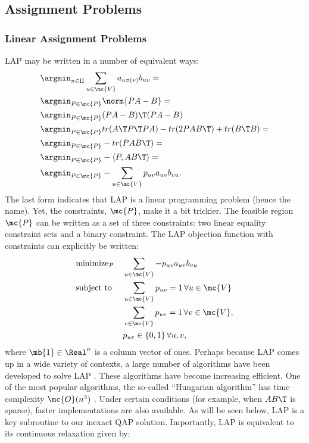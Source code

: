 \documentclass[10pt,journal,cspaper,compsoc]{IEEEtran}
\newcommand{\PmcP}{P \in \mc{P}}
\begin{document}
\subsection{Assignment Problems} %
\label{sub:assignment_problems}

\subsubsection{Linear Assignment Problems} %
\label{ssub:linear_assignment_problems}


LAP may be written in a number of equivalent ways:
\begin{align}
	 &\argmin_{\pi \in \Pi} \sum_{u \in \mc{V}} a_{u \pi(v)} b_{uv} =\nonumber\\
	&\argmin_{\PmcP} \norm{PA - B} =\nonumber\\
	&\argmin_{\PmcP} (PA-B)\T (PA-B) \nonumber\\ 
	&\argmin_{\PmcP} tr (A\T P\T PA) - tr(2PAB\T) + tr(B\T B)=\nonumber\\ 
	&\argmin_{\PmcP}  -tr (P AB\T) =\nonumber\\
	&\argmin_{\PmcP}  -\langle P, AB\T \rangle =\nonumber\\
	&\argmin_{\PmcP}  -\sum_{u \in \mc{V}} p_{uv} a_{uv} b_{vu}. \label{eq:LAP}
\end{align}
The last form indicates that LAP is a linear programming problem (hence the name).  Yet, the constraints, $\mc{P}$, make it a bit trickier.  The feasible region $\mc{P}$ can be written as a set of three constraints: two linear equality constraint sets and a binary constraint.  The LAP objection function with constraints can explicitly be written:
\begin{align}
		&\text{minimize}_P  &&\sum_{u \in \mc{V}} -p_{uv} a_{uv} b_{vu} \nonumber \\
		&\text{subject to } && \sum_{u \in \mc{V}} p_{uv} = 1 \, \forall u \in \mc{V} \nonumber \\
		& && \sum_{v \in \mc{V}} p_{uv} = 1 \, \forall v \in \mc{V}, \nonumber \\
		& &&p_{uv} \in \{0,1\} \, \forall u,v, \label{eq:LAP2}	
\end{align}
where $\mb{1} \in \Real^n$ is a column vector of ones.  
Perhaps because LAP comes up in a wide variety of contexts, a large number of algorithms have been developed to solve LAP \cite{Burkard2009}.  These algorithms have become increasing efficient.  One of the most popular algorithms, the so-called ``Hungarian algorithm'' has time complexity $\mc{O}(n^3)$ \cite{Jonker1987}.  Under certain conditions (for example, when $AB\T$ is sparse), faster implementations are also available.  As will be seen below, LAP is a key subroutine to our inexact QAP solution.  Importantly, LAP is equivalent to its continuous relaxation given by:
\end{document}

